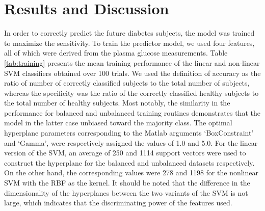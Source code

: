 \documentclass[journal,comsoc]{IEEEtran}
\renewcommand{\^}{\hat}  %
\begin{document}
%
\section{Results and Discussion}
%
%
In order to correctly predict the future diabetes subjects, the model was trained to maximize the sensitivity. To train the predictor model, we used four features, all of which were derived from the plasma glucose measurements. Table \ref{tab:training} presents the mean training performance of the linear and non-linear SVM classifiers obtained over \num{100} trials. We used the definition of accuracy as the ratio of number of correctly classified subjects to the total number of subjects, whereas the specificity was the ratio of the correctly classified healthy subjects to the total number of healthy subjects. Most notably, the similarity in the performance for balanced and unbalanced training routines demonstrates that the model in the latter case unbiased toward the majority class. The optimal hyperplane parameters corresponding to the Matlab arguments `BoxConstraint' and `Gamma', were respectively assigned the values of \num{1.0} and \num{5.0}. For the linear version of the SVM, an average of \num{250} and \num[group-minimum-digits=4, group-separator = {,}]{1114} support vectors were used to construct the hyperplane for the balanced and unbalanced datasets respectively. On the other hand, the corresponding values were \num{278} and \num[group-minimum-digits=4, group-separator = {,}]{1198} for the nonlinear SVM with the RBF as the kernel. It should be noted that the difference in the dimensionality of the hyperplanes between the two variants of the SVM is not large, which indicates that the discriminating power of the features used.
\end{document}

